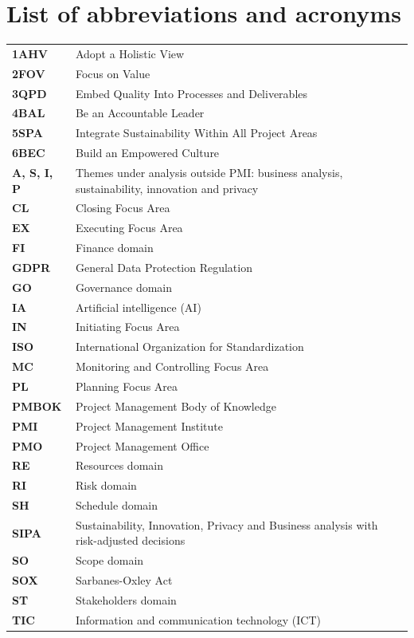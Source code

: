 \documentclass[11pt,a4paper]{article}
\begin{document}
\section*{List of abbreviations and acronyms}
\small
\begin{longtable}{@{}>{\raggedright\arraybackslash}p{2.6cm}>{\raggedright\arraybackslash}p{\dimexpr\linewidth-2.6cm-2\tabcolsep\relax}@{}}
\textbf{1AHV} & Adopt a Holistic View\\[2pt]
\textbf{2FOV} & Focus on Value\\[2pt]
\textbf{3QPD} & Embed Quality Into Processes and Deliverables\\[2pt]
\textbf{4BAL} & Be an Accountable Leader\\[2pt]
\textbf{5SPA} & Integrate Sustainability Within All Project Areas\\[2pt]
\textbf{6BEC} & Build an Empowered Culture\\[2pt]
\textbf{A, S, I, P} & Themes under analysis outside PMI: business analysis, sustainability, innovation and privacy\\[2pt]
\textbf{CL} & Closing Focus Area\\[2pt]
\textbf{EX} & Executing Focus Area\\[2pt]
\textbf{FI} & Finance domain\\[2pt]
\textbf{GDPR} & General Data Protection Regulation\\[2pt]
\textbf{GO} & Governance domain\\[2pt]
\textbf{IA} & Artificial intelligence (AI)\\[2pt]
\textbf{IN} & Initiating Focus Area\\[2pt]
\textbf{ISO} & International Organization for Standardization\\[2pt]
\textbf{MC} & Monitoring and Controlling Focus Area\\[2pt]
\textbf{PL} & Planning Focus Area\\[2pt]
\textbf{PMBOK} & Project Management Body of Knowledge\\[2pt]
\textbf{PMI} & Project Management Institute\\[2pt]
\textbf{PMO} & Project Management Office\\[2pt]
\textbf{RE} & Resources domain\\[2pt]
\textbf{RI} & Risk domain\\[2pt]
\textbf{SH} & Schedule domain\\[2pt]
\textbf{SIPA} & Sustainability, Innovation, Privacy and Business analysis with risk-adjusted decisions\\[2pt]
\textbf{SO} & Scope domain\\[2pt]
\textbf{SOX} & Sarbanes-Oxley Act\\[2pt]
\textbf{ST} & Stakeholders domain\\[2pt]
\textbf{TIC} & Information and communication technology (ICT)\\[2pt]
\end{longtable}
\endgroup
\clearpage
\end{document}
